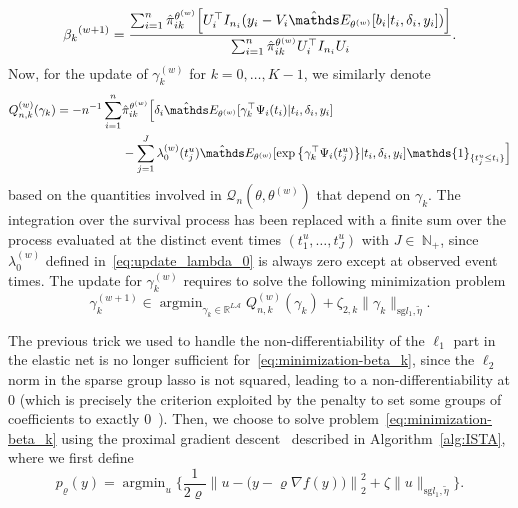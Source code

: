 \documentclass[11pt]{article}
\DeclareMathOperator{\argmin}{argmin}
\newcommand{\ind}[1]{\mathds{1}_{#1}}
\newcommand{\norm}[1]{\|#1\|}
\newcommand{\sA}{\mathscr A}
\newcommand{\cQ}{\mathcal Q}
\newcommand{\R}{\mathds R}
\newcommand{\N}{\mathds N}
\newcommand{\E}{\mathds E}
\begin{document}
\begin{equation}
  \label{eq:update_beta}
  {\beta_k}^{(w+1)}= \dfrac{\sum_{i=1}^n\hat \pi_{ik}^{\theta^{(w)}} \Big[U_i^\top I_{n_i} (y_i - V_i\hat \E_{\theta^{(w)}}[ b_i | t_i, \delta_i, y_i])\Big]}{\sum_{i=1}^n \hat \pi_{ik}^{\theta^{(w)}} U_i^\top I_{n_i} U_i}.
\end{equation}
Now, for the update of $\gamma_k^{(w)}$ for $k=0, \ldots, K-1$, we similarly denote
\begin{align*}
  Q^{(w)}_{n,k}(\gamma_k) = -n^{-1} \sum_{i=1}^n &\hat\pi_{ik}^{\theta^{(w)}} \Big[\delta_i \hat \E_{\theta^{(w)}}[ \gamma_k^\top \Psi_i(t_i) | t_i, \delta_i, y_i] \\
  & - \sum_{j=1}^J \lambda_0^{(w)}(t_j^u) \hat \E_{\theta^{(w)}}[\exp \big\{\gamma_k^\top \Psi_i(t_j^u)\big\} | t_i, \delta_i, y_i] \ind{\{t_j^u \leq t_i\}} \Big]
\end{align*}
based on the quantities involved in $\cQ_n(\theta, \theta^{(w)})$ that depend on $\gamma_k$. The integration over the survival process has been replaced with a finite sum over the process evaluated at the distinct event times $(t_1^u, \ldots, t_J^u)$ with $J \in~\N_+$, since $\lambda_0^{(w)}$ defined in~\eqref{eq:update_lambda_0} is always zero except at observed event times. The update for $\gamma_k^{(w)}$ requires to solve the following minimization problem
\begin{equation}
  \label{eq:minimization-gamma_k}
  \gamma_k^{(w+1)} \in \argmin_{\gamma_k \in \R^{L\sA}} Q^{(w)}_{n,k}(\gamma_k) + \zeta_{2,k} \norm{\gamma_k}_{\text{sg} l_1, \tilde{\eta}}.
\end{equation}

The previous trick we used to handle the non-differentiability of the $\ell_1$ part in the elastic net is no longer sufficient for~\eqref{eq:minimization-beta_k}, since the $\ell_2$ norm in the sparse group lasso is not squared, leading to a non-differentiability at 0 (which is precisely the criterion exploited by the penalty to set some groups of coefficients to exactly 0~\citep{simon2013sparse}). Then, we choose to solve problem~\eqref{eq:minimization-beta_k} using the proximal gradient descent~\citep{boyd2004convex} described in Algorithm~\ref{alg:ISTA}, where we first define
\[p_{\varrho}(y) = \argmin_u \Big\{\dfrac{1}{2\varrho} \left\lVert u - \big(y - \varrho  \nabla f(y) \big)\right\rVert_2^2 + \zeta \norm{u}_{\text{sg} l_1, \tilde{\eta}} \Big\}.\]

\vspace{.5cm}
\end{document}
